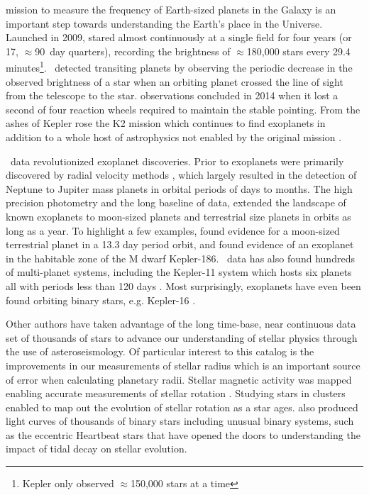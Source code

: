 
 mission to measure the frequency of Earth-sized planets in the Galaxy is an important step towards understanding the Earth's place in the Universe.  Launched in 2009, \Kepler{} stared almost continuously at a single field for four years (or 17, $\approx$90~day quarters), recording the brightness of $\approx$180,000 stars every 29.4 minutes\footnote{Kepler only observed $\approx$150,000 stars at a time}. \Kepler\ detected transiting planets by observing the periodic decrease in the observed brightness of a star when an orbiting planet crossed the line of sight from the telescope to the star.  observations concluded in 2014 when it lost a second of four reaction wheels required to maintain the stable pointing.  From the ashes of Kepler rose the K2 mission which continues to find exoplanets in addition to a whole host of astrophysics not enabled by the original \Kepler{} mission \citep{Howell2014}.


\Kepler\ data revolutionized exoplanet discoveries. Prior to \Kepler{,} exoplanets were primarily discovered by radial velocity methods \citep[e.g.][]{Mayor1995}, which largely resulted in the detection of Neptune to Jupiter mass planets in orbital periods of days to months. The high precision photometry and the long baseline of \Kepler{} data, extended the landscape of known exoplanets to moon-sized planets and terrestrial size planets in orbits as long as a year. To highlight a few examples, \citet{Barclay2013} found evidence for a moon-sized terrestrial planet in a 13.3 day period orbit, and \citet{Quintana2014} found evidence of an exoplanet in the habitable zone of the M dwarf Kepler-186. \Kepler\ data has also found hundreds of multi-planet systems, including the Kepler-11 system which hosts six planets all with periods less than 120 days \citep{Lissauer2011}. Most surprisingly, exoplanets have even been found orbiting binary stars, e.g. Kepler-16 \citep{Doyle2011}.

Other authors have taken advantage of the long time-base, near continuous data set of thousands of stars to advance our understanding of stellar physics through the use of asteroseismology. Of particular interest to this catalog is the improvements in our measurements of stellar radius \citep[e.g.][]{Huber2014a,Mathur2017} which is an important source of error when calculating planetary radii. Stellar magnetic activity was mapped enabling accurate measurements of stellar rotation \citep[e.g.][]{Aigrain2015,McQuillan2014}. Studying stars in clusters enabled \citet{Meibom2011} to map out the evolution of stellar rotation as a star ages. \Kepler{} also produced light curves of thousands of binary stars \citep{Prsa2011,Kirk2016} including unusual binary systems, such as the eccentric Heartbeat stars \citep{Welsh2011,Thompson2012} that have opened the doors to understanding the impact of tidal decay on stellar evolution.

